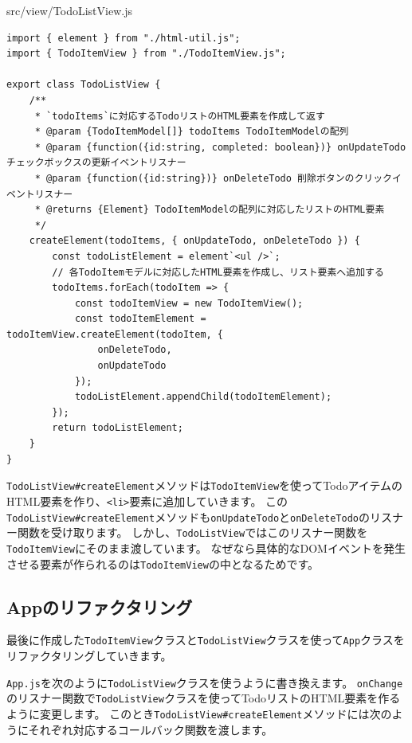 \begin{listtitle}
src/view/TodoListView.js
\end{listtitle}
\begin{lstlisting}
import { element } from "./html-util.js";
import { TodoItemView } from "./TodoItemView.js";

export class TodoListView {
    /**
     * `todoItems`に対応するTodoリストのHTML要素を作成して返す
     * @param {TodoItemModel[]} todoItems TodoItemModelの配列
     * @param {function({id:string, completed: boolean})} onUpdateTodo チェックボックスの更新イベントリスナー
     * @param {function({id:string})} onDeleteTodo 削除ボタンのクリックイベントリスナー
     * @returns {Element} TodoItemModelの配列に対応したリストのHTML要素
     */
    createElement(todoItems, { onUpdateTodo, onDeleteTodo }) {
        const todoListElement = element`<ul />`;
        // 各TodoItemモデルに対応したHTML要素を作成し、リスト要素へ追加する
        todoItems.forEach(todoItem => {
            const todoItemView = new TodoItemView();
            const todoItemElement = todoItemView.createElement(todoItem, {
                onDeleteTodo,
                onUpdateTodo
            });
            todoListElement.appendChild(todoItemElement);
        });
        return todoListElement;
    }
}
\end{lstlisting}
\listend

\texttt{TodoListView\#createElement}メソッドは\texttt{TodoItemView}を使ってTodoアイテムのHTML要素を作り、\texttt{<li>}要素に追加していきます。
この\texttt{TodoListView\#createElement}メソッドも\texttt{onUpdateTodo}と\texttt{onDeleteTodo}のリスナー関数を受け取ります。
しかし、\texttt{TodoListView}ではこのリスナー関数を\texttt{TodoItemView}にそのまま渡しています。
なぜなら具体的なDOMイベントを発生させる要素が作られるのは\texttt{TodoItemView}の中となるためです。

\hypertarget{app-refactoring}{%
\subsection{Appのリファクタリング}\label{app-refactoring}}

最後に作成した\texttt{TodoItemView}クラスと\texttt{TodoListView}クラスを使って\texttt{App}クラスをリファクタリングしていきます。

\texttt{App.js}を次のように\texttt{TodoListView}クラスを使うように書き換えます。
\texttt{onChange}のリスナー関数で\texttt{TodoListView}クラスを使ってTodoリストのHTML要素を作るように変更します。
このとき\texttt{TodoListView\#createElement}メソッドには次のようにそれぞれ対応するコールバック関数を渡します。

